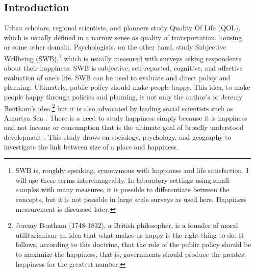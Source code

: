 \documentclass[12pt, letterpaper]{article}
\begin{document}
\begin{spacing}{1.9}


\section*{Introduction}

Urban scholars, regional scientists, and planners study Quality Of
Life (QOL), which is usually defined in a narrow sense as
quality of transportation, housing, or some other
domain. Psychologists, on the other
hand, study Subjective Wellbeing (SWB),\footnote{SWB is, roughly
  speaking, 
synonymous with happiness and life satisfaction. I will use these terms
interchangeably. In laboratory settings
using small samples with many
measures, it is possible to differentiate between the concepts, but it is not
possible in large scale surveys as used here.
Happiness measurement is discussed later. 
} which is usually measured
 with surveys asking respondents about their happiness. SWB is
subjective, self-reported, cognitive, and affective evaluation of one's
life. SWB can be used to evaluate and direct policy and planning. 
Ultimately, public policy 
should  make people happy. This idea, to make people
happy through policies and planning, is not only the author's or Jeremy
Bentham's idea,\footnote{Jeremy Bentham (1748-1832), a British  philosopher, is
  a founder of moral utilitarianism--an idea that what  makes us happy is the
  right thing to do. It follows, according to  this doctrine,  that the role of
  the public policy should be to maximize the happiness, that is,  governments
  should produce  the  greatest happiness for the greatest number.} but it is
also advocated  by leading social scientists such as  Amartya Sen
\citep{stiglitz09al}.   There is a  need to
study happiness simply because
it is happiness and not  income or consumption that
is the ultimate goal of broadly understood development \citep[e.g.,][]{stiglitz09al,diener12, easterlin13}. 
This study draws on sociology,
psychology, and geography to 
  investigate the link between size of a place and happiness. 




\end{spacing}
\end{document}
